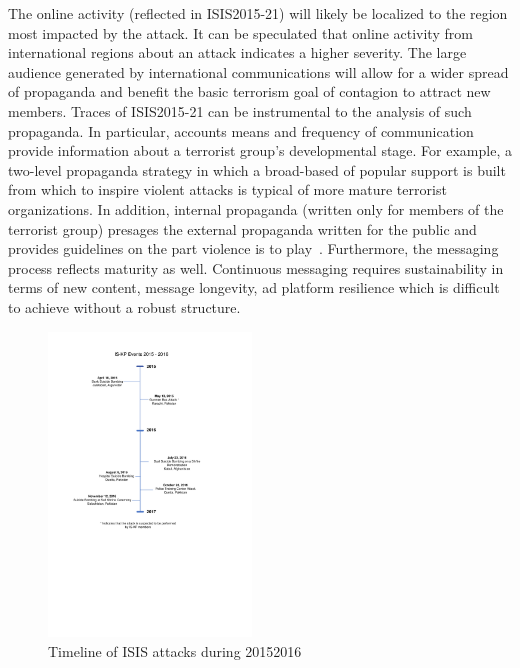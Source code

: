 \documentclass[letterpaper]{article} %
\begin{document}
The online activity (reflected in ISIS2015-21)  will likely be localized to the region most impacted by the attack. It can be speculated that online activity from international regions about an attack indicates a higher severity. The large audience generated by international communications will allow for a wider spread of propaganda and benefit the basic terrorism goal of contagion to attract new members. Traces of ISIS2015-21 can be instrumental to the analysis of such propaganda.  In particular, accounts means and frequency of communication  provide information about a terrorist group's developmental stage. For example, a two-level propaganda strategy in which a broad-based of popular support is built from which to inspire violent attacks is typical of more mature terrorist organizations. In addition, internal propaganda (written only for members of the terrorist group) presages the external propaganda written for the public and provides guidelines on the part violence is to play~\cite{international1975clandestine}. Furthermore, the messaging process reflects maturity as well. Continuous messaging requires sustainability in terms of new content, message longevity, ad platform resilience which is difficult to achieve without a robust structure.


\begin{figure}[ht]
\includegraphics[width=0.48\textwidth]{img/Timeline2015-2016.pdf}
\caption{Timeline of ISIS attacks during 20152016}
\label{fig:Timeline2015-2016}
\end{figure}
\end{document}

